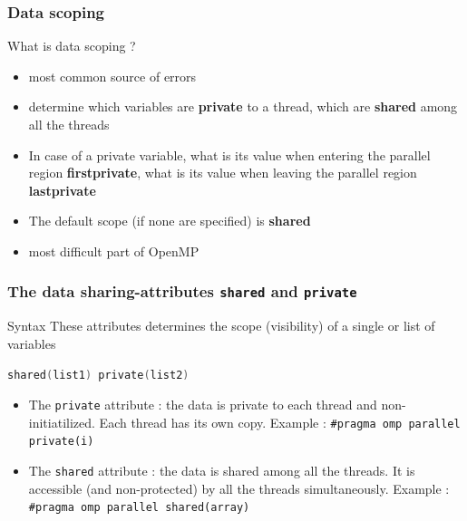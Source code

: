\begin{frame}[containsverbatim]
  \frametitle{Data scoping}
  What is data scoping ?
  \begin{itemize}
  \item{most common source of errors}
  \item{determine which variables are {\bf private} to a thread, which are {\bf shared} among all the threads}
  \item{In case of a private variable, what is its value when entering the
      parallel region {\bf firstprivate}, what is its value when leaving the
      parallel region {\bf lastprivate}}
  \item The default scope (if none are specified) is \textbf{shared}
  \item{most difficult part of OpenMP}
  \end{itemize}
\end{frame}


\begin{frame}[fragile]
  \frametitle{The data sharing-attributes \texttt{shared} and \texttt{private}}
  \begin{exampleblock}{Syntax}
These attributes determines the scope (visibility) of a single or list of variables
\begin{lstlisting}[language=C,frame=lines]
shared(list1) private(list2)
\end{lstlisting}

\begin{itemize}
\item{The \verb+private+ attribute : the data is private to each thread and non-initiatilized. Each thread has its own copy. Example : \verb+#pragma omp parallel private(i)+}
\item{The \verb+shared+ attribute : the data is shared among all the threads. It is accessible (and non-protected) by all the threads simultaneously. Example : \verb+#pragma omp parallel shared(array)+}
\end{itemize}

\end{exampleblock}

\end{frame}



